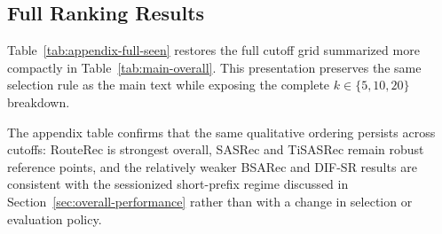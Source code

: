 \documentclass[sigconf,review,anonymous]{acmart}
\begin{document}
\subsection{Full Ranking Results}
Table~\ref{tab:appendix-full-seen} restores the full cutoff grid summarized more compactly in Table~\ref{tab:main-overall}. This presentation preserves the same selection rule as the main text while exposing the complete $k\in\{5,10,20\}$ breakdown.

The appendix table confirms that the same qualitative ordering persists across cutoffs: RouteRec is strongest overall, SASRec and TiSASRec remain robust reference points, and the relatively weaker BSARec and DIF-SR results are consistent with the sessionized short-prefix regime discussed in Section~\ref{sec:overall-performance} rather than with a change in selection or evaluation policy.
\end{document}

